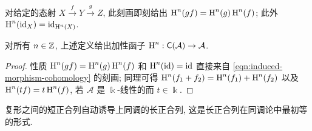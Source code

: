 对给定的态射 $X \xrightarrow{f} Y \xrightarrow{g} Z$, 此刻画即刻给出 $\operatorname{H}^n(gf) = \operatorname{H}^n(g) \operatorname{H}^n(f)$; 此外 $\operatorname{H}^n(\mathrm{id}_X) = \mathrm{id}_{\operatorname{H}^n(X)}$.

\begin{proposition}[上同调作为函子]\label{prop:H-functor}
	对所有 $n \in \mathbb{Z}$, 上述定义给出加性函子 $\operatorname{H}^n: \mathsf{C}(\mathcal{A}) \to \mathcal{A}$.
\end{proposition}
\begin{proof}
	性质 $\operatorname{H}^n(gf) = \operatorname{H}^n(g) \operatorname{H}^n(f)$ 和 $\operatorname{H}^n(\mathrm{id}) = \mathrm{id}$ 直接来自 \eqref{eqn:induced-morphism-cohomology} 的刻画; 同理可得 $\operatorname{H}^n(f_1 + f_2) = \operatorname{H}^n(f_1) + \operatorname{H}^n(f_2)$ 以及 $\operatorname{H}^n(tf) = t\operatorname{H}^n(f)$, 若 $\mathcal{A}$ 是 $\Bbbk$-线性的而 $t \in \Bbbk$.
\end{proof}

复形之间的短正合列自动诱导上同调的长正合列, 这是长正合列在同调论中最初等的形式.

